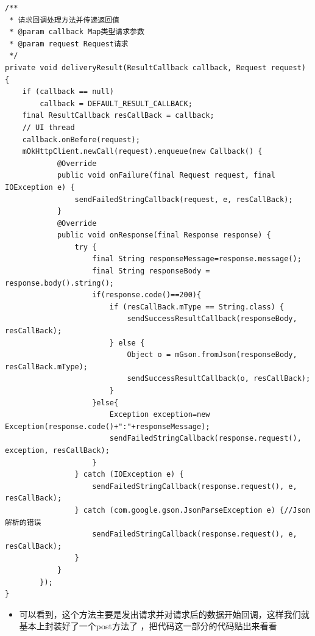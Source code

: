 \documentclass[9pt, b5paper]{article}
\begin{document}
\begin{verbatim}
/**
 * 请求回调处理方法并传递返回值
 * @param callback Map类型请求参数
 * @param request Request请求
 */
private void deliveryResult(ResultCallback callback, Request request) {
    if (callback == null)
        callback = DEFAULT_RESULT_CALLBACK;
    final ResultCallback resCallBack = callback;
    // UI thread
    callback.onBefore(request);
    mOkHttpClient.newCall(request).enqueue(new Callback() {
            @Override
            public void onFailure(final Request request, final IOException e) {
                sendFailedStringCallback(request, e, resCallBack);
            }
            @Override
            public void onResponse(final Response response) {
                try {
                    final String responseMessage=response.message();
                    final String responseBody = response.body().string();
                    if(response.code()==200){
                        if (resCallBack.mType == String.class) {
                            sendSuccessResultCallback(responseBody, resCallBack);
                        } else {
                            Object o = mGson.fromJson(responseBody, resCallBack.mType);
                            sendSuccessResultCallback(o, resCallBack);
                        }
                    }else{
                        Exception exception=new Exception(response.code()+":"+responseMessage);
                        sendFailedStringCallback(response.request(), exception, resCallBack);
                    }
                } catch (IOException e) {
                    sendFailedStringCallback(response.request(), e, resCallBack);
                } catch (com.google.gson.JsonParseException e) {//Json解析的错误
                    sendFailedStringCallback(response.request(), e, resCallBack);
                }
            }
        });
}
\end{verbatim}
\begin{itemize}
\item 可以看到，这个方法主要是发出请求并对请求后的数据开始回调，这样我们就基本上封装好了一个post方法了  ，把代码这一部分的代码贴出来看看
\end{itemize}
\end{document}
